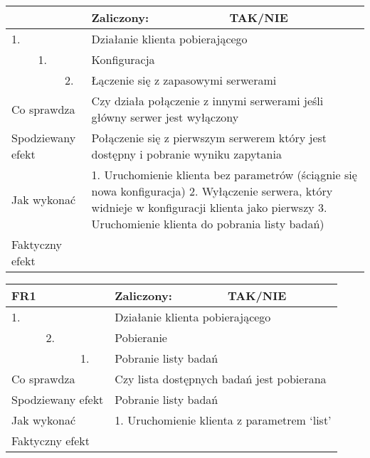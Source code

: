 \begin{tabular}{|p{20pt}|p{20pt}|p{20pt}|p{250pt}|p{60pt}|}
	\hline
	\multicolumn{3}{|p{70pt}|}{} & Zaliczony: & TAK/NIE \\ \hline
	1. & & & \multicolumn{2}{|p{310pt}|}{Działanie klienta pobierającego } \\ \hline
	& 1. & & \multicolumn{2}{|p{310pt}|}{Konfiguracja } \\ \hline
	& & 2. & \multicolumn{2}{|p{310pt}|}{Łączenie się z zapasowymi serwerami } \\ \hline
	\multicolumn{3}{|p{70pt}|}{Co sprawdza} & \multicolumn{2}{|p{310pt}|}{Czy działa połączenie z innymi serwerami jeśli główny serwer jest wyłączony} \\ \hline
	\multicolumn{3}{|p{70pt}|}{Spodziewany efekt} & \multicolumn{2}{|p{310pt}|}{Połączenie się z pierwszym serwerem który jest dostępny i pobranie wyniku zapytania} \\ \hline
	\multicolumn{3}{|p{70pt}|}{Jak wykonać} & \multicolumn{2}{|p{310pt}|}{1. Uruchomienie klienta bez parametrów (ściągnie się nowa konfiguracja)
2. Wyłączenie serwera, który widnieje w konfiguracji klienta jako pierwszy
3. Uruchomienie klienta do pobrania listy badań)} \\ \hline
	\multicolumn{3}{|p{70pt}|}{Faktyczny efekt} & \multicolumn{2}{|p{310pt}|}{} \\ \hline
\end{tabular}

\begin{tabular}{|p{20pt}|p{20pt}|p{20pt}|p{250pt}|p{60pt}|}
	\hline
	\multicolumn{3}{|p{70pt}|}{FR1} & Zaliczony: & TAK/NIE \\ \hline
	1. & & & \multicolumn{2}{|p{310pt}|}{Działanie klienta pobierającego } \\ \hline
	& 2. & & \multicolumn{2}{|p{310pt}|}{Pobieranie } \\ \hline
	& & 1. & \multicolumn{2}{|p{310pt}|}{Pobranie listy badań } \\ \hline
	\multicolumn{3}{|p{70pt}|}{Co sprawdza} & \multicolumn{2}{|p{310pt}|}{Czy lista dostępnych badań jest pobierana} \\ \hline
	\multicolumn{3}{|p{70pt}|}{Spodziewany efekt} & \multicolumn{2}{|p{310pt}|}{Pobranie listy badań} \\ \hline
	\multicolumn{3}{|p{70pt}|}{Jak wykonać} & \multicolumn{2}{|p{310pt}|}{1. Uruchomienie klienta z parametrem ‘list’} \\ \hline
	\multicolumn{3}{|p{70pt}|}{Faktyczny efekt} & \multicolumn{2}{|p{310pt}|}{} \\ \hline
\end{tabular}

